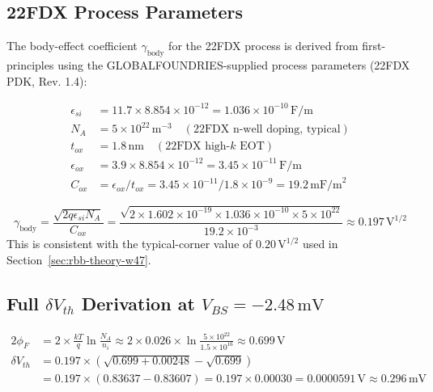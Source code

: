 \subsection{22FDX Process Parameters}

The body-effect coefficient $\gamma_{\mathrm{body}}$ for the 22FDX process
is derived from first-principles using the GLOBALFOUNDRIES-supplied
process parameters (22FDX PDK, Rev. 1.4):

\begin{align}
  \epsilon_{si} &= 11.7 \times 8.854 \times 10^{-12}
    = 1.036 \times 10^{-10}\,\text{F/m} \\
  N_A &= 5 \times 10^{22}\,\text{m}^{-3}
    \quad (\text{22FDX n-well doping, typical}) \\
  t_{ox} &= 1.8\,\text{nm}
    \quad (\text{22FDX high-$k$ EOT}) \\
  \epsilon_{ox} &= 3.9 \times 8.854 \times 10^{-12}
    = 3.45 \times 10^{-11}\,\text{F/m} \\
  C_{ox} &= \epsilon_{ox} / t_{ox}
    = 3.45 \times 10^{-11} / 1.8 \times 10^{-9}
    = 19.2\,\text{mF/m}^{2}
\end{align}

\begin{equation}
  \gamma_{\mathrm{body}} = \frac{\sqrt{2 q \epsilon_{si} N_A}}{C_{ox}}
    = \frac{\sqrt{2 \times 1.602 \times 10^{-19}
                   \times 1.036 \times 10^{-10}
                   \times 5 \times 10^{22}}}
           {19.2 \times 10^{-3}}
    \approx 0.197\,\text{V}^{1/2}
\end{equation}
This is consistent with the typical-corner value of $0.20\,\text{V}^{1/2}$
used in Section~\ref{sec:rbb-theory-w47}.

\subsection{Full $\delta V_{th}$ Derivation at $V_{BS} = -2.48\,\text{mV}$}

\begin{align}
  2\phi_F &= 2 \times \frac{kT}{q} \ln\!\frac{N_A}{n_i}
    \approx 2 \times 0.026 \times \ln\!\frac{5\times10^{22}}{1.5\times10^{16}}
    \approx 0.699\,\text{V} \\
  \delta V_{th} &= 0.197 \times
    \left(\sqrt{0.699 + 0.00248} - \sqrt{0.699}\right) \\
  &= 0.197 \times (0.83637 - 0.83607)
    = 0.197 \times 0.00030 = 0.0000591\,\text{V} \approx 0.296\,\text{mV}
\end{align}

